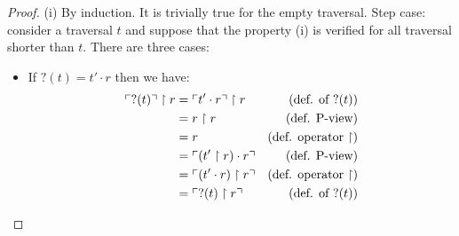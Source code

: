 \begin{proof}
(i) By induction. It is trivially true for the empty
traversal. Step case: consider a traversal $t$ and
suppose that the property (i) is verified for all traversal shorter
than $t$. There are three cases:
\begin{itemize}
\item If $?(t) = t' \cdot r$ then we have:
    \begin{align*}
    \ulcorner ?(t) \urcorner \upharpoonright  r
        &=  \ulcorner t' \cdot r  \urcorner \upharpoonright  r       & (\mbox{def. of } ?(t))\\
        &=  r \upharpoonright  r                         & (\mbox{def. P-view})\\
        &=  r                                                & (\mbox{def. operator $\upharpoonright$})\\
        &=  \ulcorner (t' \upharpoonright  r ) \cdot r  \urcorner    & (\mbox{def. P-view})\\
        &=  \ulcorner (t' \cdot r)  \upharpoonright  r  \urcorner    & (\mbox{def. operator $\upharpoonright$})\\
        &= \ulcorner ?(t) \upharpoonright  r  \urcorner                & (\mbox{def. of } ?(t))
    \end{align*}


\end{itemize}
\end{proof}
